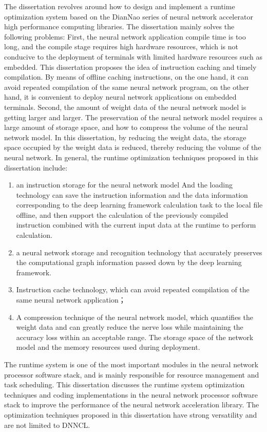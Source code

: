 \begin{enabstract}
  The dissertation revolves around how to design and implement a runtime optimization system based on the DianNao series of neural network accelerator high performance computing libraries. The dissertation mainly solves the following problems: First, the neural network application compile time is too long, and the compile stage requires high hardware resources, which is not conducive to the deployment of terminals with limited hardware resources such as embedded. This dissertation proposes the idea of ​​instruction caching and timely compilation. By means of offline caching instructions, on the one hand, it can avoid repeated compilation of the same neural network program, on the other hand, it is convenient to deploy neural network applications on embedded terminals. Second, the amount of weight data of the neural network model is getting larger and larger. The preservation of the neural network model requires a large amount of storage space, and how to compress the volume of the neural network model. In this dissertation, by reducing the weight data, the storage space occupied by the weight data is reduced, thereby reducing the volume of the neural network. In general, the runtime optimization techniques proposed in this dissertation include: 
\begin{enumerate}
  \item an instruction storage for the neural network model And the loading technology can save the instruction information and the data information corresponding to the deep learning framework calculation task to the local file offline, and then support the calculation of the previously compiled instruction combined with the current input data at the runtime to perform calculation.
  \item a neural network storage and recognition technology that accurately preserves the computational graph information passed down by the deep learning framework.
  \item Instruction cache technology, which can avoid repeated compilation of the same neural network application；
  \item A compression technique of the neural network model, which quantifies the weight data and can greatly reduce the nerve loss while maintaining the accuracy loss within an acceptable range. The storage space of the network model and the memory resources used during deployment.
\end{enumerate}
  
  The runtime system is one of the most important modules in the neural network processor software stack, and is mainly responsible for resource management and task scheduling. This dissertation discusses the runtime system optimization techniques and coding implementations in the neural network processor software stack to improve the performance of the neural network acceleration library. The optimization techniques proposed in this dissertation have strong versatility and are not limited to DNNCL.

\end{enabstract}
\cleardoublepage
